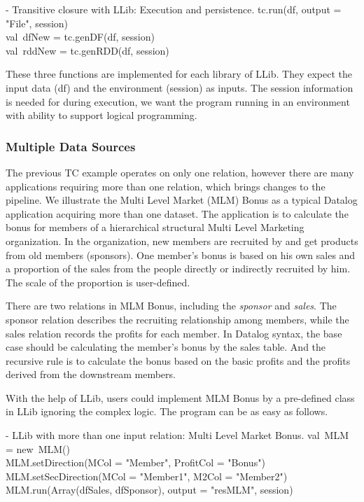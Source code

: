\vspace{0.5em}
 - Transitive closure with LLib:  Execution and persistence.
\bldl
tc.run(df, output = "File", session) \\
val\ dfNew = tc.genDF(df, session) \\
val\ rddNew = tc.genRDD(df, session) \\

\eldl


These three functions are implemented for each library of LLib. They expect the input data (df) and the environment (session) as inputs.  The session information is needed for during execution, we want the program running in an environment with ability to support logical
programming. 


\subsubsection{Multiple Data Sources}
\label{sec:multiple}
The previous TC example operates on only one relation, however there are many applications requiring more than one relation, which brings changes to the  pipeline. We illustrate the Multi Level Market (MLM) Bonus as a typical Datalog application \citep{mlm} acquiring more than one dataset. The application is to calculate the bonus for members of a hierarchical structural Multi Level Marketing  organization. In the organization,  new members are recruited by  and get products from old members (sponsors). One member's bonus is based on his own sales and a proportion of the sales from the people directly or indirectly recruited by him. The  scale of the proportion is user-defined. 

There are two relations in MLM Bonus, including the \textit{sponsor} and \textit{sales}. The sponsor relation describes the recruiting relationship among members, while the sales relation records the profits for each member. In  Datalog syntax, the base case should be calculating the member's bonus by the sales table. And the recursive rule is to calculate the bonus based on the basic profits and the profits derived from the downstream members.

With the help of LLib, users could implement MLM Bonus by a pre-defined class in LLib  ignoring the complex logic. The program can be as easy as  follows.

\vspace{0.5em}
 - LLib with more than one input relation: Multi Level Market Bonus.
\bldl
val\ MLM = new\ MLM() \\
MLM.setDirection(MCol = "Member", ProfitCol = "Bonus")\\
MLM.setSecDirection(MCol = "Member1", M2Col = "Member2") \\
MLM.run(Array(dfSales, dfSponsor), output = "resMLM", session) \\

